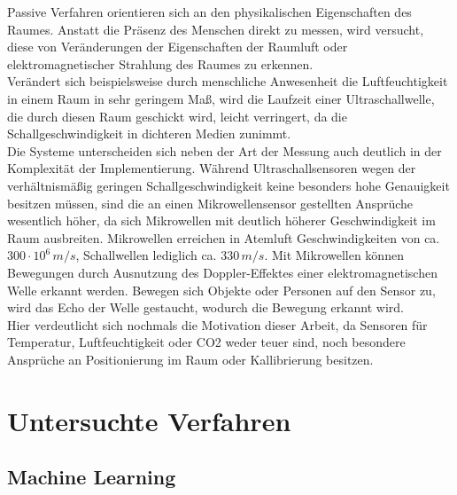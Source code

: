 Passive Verfahren orientieren sich an den physikalischen Eigenschaften des Raumes. Anstatt die Präsenz des 
Menschen direkt zu messen, wird versucht, diese von Veränderungen der Eigenschaften der Raumluft oder 
elektromagnetischer Strahlung des Raumes zu erkennen. \\
Verändert sich beispielsweise durch menschliche Anwesenheit die Luftfeuchtigkeit 
in einem Raum in sehr geringem Maß, wird die  Laufzeit einer Ultraschallwelle, die durch diesen Raum 
geschickt wird, leicht verringert, da die Schallgeschwindigkeit in dichteren Medien zunimmt.\\
Die Systeme unterscheiden sich neben der Art der Messung auch deutlich in der Komplexität der Implementierung.
Während Ultraschallsensoren wegen der verhältnismäßig geringen Schallgeschwindigkeit keine besonders hohe 
Genauigkeit besitzen müssen, sind die an einen Mikrowellensensor gestellten Ansprüche wesentlich höher, da sich
Mikrowellen mit deutlich höherer Geschwindigkeit im Raum ausbreiten. Mikrowellen erreichen in Atemluft Geschwindigkeiten
von ca. $300\cdot10^6 \,m/s$, Schallwellen lediglich ca. $330\, m/s$.
Mit Mikrowellen können Bewegungen durch Ausnutzung des Doppler-Effektes einer elektromagnetischen Welle erkannt 
werden. Bewegen sich Objekte oder Personen auf den Sensor zu, wird das Echo der Welle gestaucht, wodurch die 
Bewegung erkannt wird.\\
Hier verdeutlicht sich nochmals die Motivation dieser Arbeit, da Sensoren für Temperatur, Luftfeuchtigkeit oder CO2
weder teuer sind, noch besondere Ansprüche an Positionierung im Raum oder Kallibrierung besitzen.

\chapter{\textbf{Untersuchte Verfahren}}

\section{Machine Learning}\label{unterkapitel}

